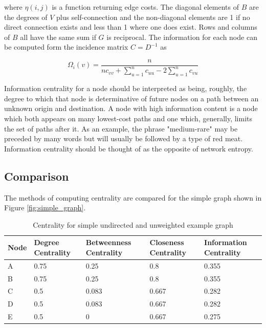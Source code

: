 where $\eta(i, j)$ is a function returning edge costs. The diagonal elements of $B$ are the degrees of $V$ plus self-connection and the non-diagonal elements are 1 if no direct connection exists and less than 1 where one does exist. Rows and columns of $B$ all have the same sum if $G$ is reciprocal. The information for each node can be computed form the incidence matrix $C = D^{-1}$ as

\begin{equation}
	\Omega_i(v) = \frac{n}{nc_{vv} + \sum_{u = 1}^{n} c_{uu} - 2 \sum_{u = 1}^{n}c_{vu}}\label{eq:information_centrality}
\end{equation}

Information centrality for a node should be interpreted as being, roughly, the degree to which that node is determinative of future nodes on a path between an unknown origin and destination. A node with high information content is a node which both appears on many lowest-cost paths and one which, generally, limits the set of paths after it. As an example, the phrase "medium-rare" may be preceded by many words but will usually be followed by a type of red meat. Information centrality should be thought of as the opposite of network entropy.

\subsection{Comparison}

The methods of computing centrality are compared for the simple graph shown in Figure \ref{fig:simple_graph}.

\begin{table}[H]
	\centering
	\caption{Centrality for simple undirected and unweighted example graph}
	\label{tab:unweighted_centrality}
	\begin{tabular}{|C{.2\linewidth}|C{.2\linewidth}|C{.2\linewidth}|C{.2\linewidth}|C{.2\linewidth}|}
		\hline Node & Degree Centrality & Betweenness Centrality & Closeness Centrality & Information Centrality \\
		\hline A & 0.75 & 0.25 & 0.8 & 0.355 \\
		\hline B & 0.75 & 0.25 & 0.8 & 0.355 \\
		\hline C & 0.5 & 0.083 & 0.667 & 0.282 \\
		\hline D & 0.5 & 0.083 & 0.667 & 0.282 \\
		\hline E & 0.5 & 0 & 0.667 & 0.275 \\
		\hline
	\end{tabular}
\end{table}


